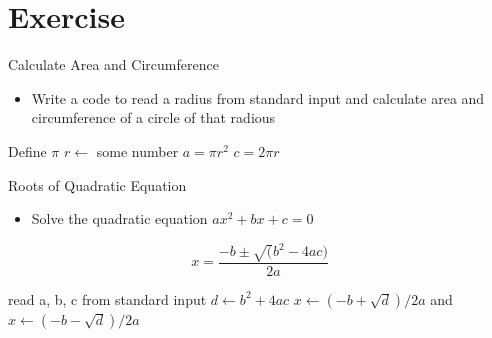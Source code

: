 \documentclass[10pt,t]{beamer}
\begin{document}
\section{Exercise}

\begin{frame}{Calculate Area and Circumference}
  \begin{itemize}
  \item Write a code to read a radius from standard input and calculate area and circumference of a circle of that radious
  \end{itemize}
  \begin{algorithm}[H]
    \caption{Pseudo code for calculating area and circumference} 
    \begin{algorithmic}
      \State Define $\pi$
      \State $r \gets$ some number
      \State $a = \pi{}r^2$
      \State $c = 2\pi{}r$
    \end{algorithmic}
  \end{algorithm}
\end{frame}

\begin{frame}{Roots of Quadratic Equation}
  \begin{itemize}
  \item Solve the quadratic equation $ax^2 + bx + c = 0$
  \end{itemize}
    \begin{equation*}
      x = \frac{-b \pm \sqrt(b^2 - 4ac)}{2a}
    \end{equation*}
    \begin{algorithm}[H]
      \caption{Pseudo Code for Solving Quadratic Equation}
      \begin{algorithmic}
        \State read a, b, c from standard input
        \State $d \gets b^2 + 4ac$
        \State $x \gets (-b + \sqrt{d})/2a$ and $x \gets (-b -\sqrt{d})/2a$
      \end{algorithmic}
    \end{algorithm}
\end{frame}
\end{document}
